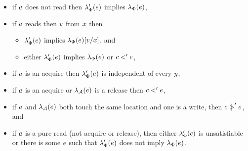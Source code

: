 \begin{definition}
\begin{itemize}
\item if $a$ does not read then $\lambda_{\Phi}'(e)$ implies $\lambda_{\Phi}(e)$,
\item if $a$ reads then $v$ from $x$ then
  \begin{itemize}
  \item $\lambda_{\Phi}'(e)$ implies $\lambda_{\Phi}(e)[v/x]$, and
  \item either $\lambda_{\Phi}'(e)$ implies $\lambda_{\Phi}(e)$ or $c<'e$, 
  \end{itemize}
\item if $a$ is an acquire then $\lambda_{\Phi}'(e)$ is independent of every $y$,
\item if $a$ is an acquire or $\lambda_{\mathcal{A}}(e)$ is a release then $c <' e$, 
\item if $a$ and $\lambda_{\mathcal{A}}(e)$ both touch the same location and one is a write,
    then $c \mathrel{\mkern4mu\mid\!\!\!>}' e$, and
\item if $a$ is a pure read (not acquire or release), then either
  $\lambda_{\Phi}'(c)$ is unsatisfiable or there is some $e$ such
  that $\lambda_{\Phi}'(e)$ does not imply $\lambda_{\Phi}(e)$.

\end{itemize}
\end{definition}
